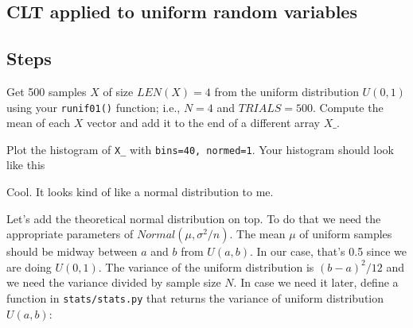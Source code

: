 \begin{fullwidth}
\section{CLT applied to uniform random variables}

\subsection{Steps}

\step Get 500 samples $X$ of size $LEN(X)=4$ from the uniform distribution $U(0,1)$ using your {\tt runif01()} function; i.e., $N=4$ and $TRIALS=500$.  Compute the mean of each $X$ vector and add it to the end of a different array $X\_$.

\step Plot the histogram of {\tt X\_} with {\tt bins=40, normed=1}.  Your histogram should look like this \\

    
Cool.  It looks kind of like a normal distribution to me. 

\step Let's add the theoretical normal distribution on top. To do that we need the appropriate parameters of $Normal(\mu, \sigma^2/n)$. The mean  $\mu$ of uniform samples should be midway between $a$ and $b$ from $U(a,b)$. In our case, that's 0.5 since we are doing $U(0,1)$. The variance of the uniform distribution is $(b-a)^2/12$ and we need the variance divided by sample size $N$.   In case we need it later, define a function in {\tt stats/stats.py} that returns the variance of uniform distribution $U(a,b)$:


\end{fullwidth}
